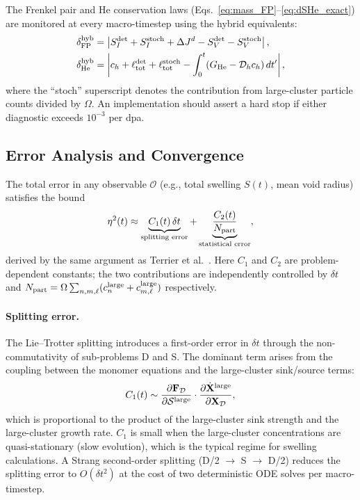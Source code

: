 \documentclass[pdflatex,sn-basic]{sn-jnl} %
\begin{document}
The Frenkel pair and He conservation laws
(Eqs.~\ref{eq:mass_FP}--\ref{eq:dSHe_exact}) are monitored at
every macro-timestep using the hybrid equivalents:
\begin{align}
    \delta_{\rm FP}^{\rm hyb}
    &= \left|
         S_I^{\rm det} + S_I^{\rm stoch}
         + \Delta J^d
         - S_V^{\rm det} - S_V^{\rm stoch}
       \right|,
    \label{eq:hybrid_dFP}\\
    \delta_{\rm He}^{\rm hyb}
    &= \left|
         c_h + \ell_{\rm tot}^{\rm det} + \ell_{\rm tot}^{\rm stoch}
         - \int_0^t (G_{\rm He} - \mathcal{D}_h c_h)\,dt'
       \right|,
    \label{eq:hybrid_dHe}
\end{align}
where the ``stoch'' superscript denotes the contribution from
large-cluster particle counts divided by $\Omega$.  An
implementation should assert a hard stop if either diagnostic
exceeds $10^{-3}$ per dpa.

\subsection{Error Analysis and Convergence}
\label{sec:hybrid_error}

The total error in any observable $\mathcal{O}$ (e.g., total
swelling $S(t)$, mean void radius) satisfies the bound
\begin{equation}\label{eq:hybrid_error}
    \eta^2(t)
    \approx \underbrace{C_1(t)\,\delta t}_{\text{splitting error}}
    + \underbrace{\frac{C_2(t)}{N_{\rm part}}}_{\text{statistical error}},
\end{equation}
derived by the same argument as Terrier et al.~\cite{Terrier2017}.
Here $C_1$ and $C_2$ are problem-dependent constants; the two
contributions are independently controlled by $\delta t$ and
$N_{\rm part} = \Omega \sum_{n,m,\ell}(c_n^{\rm large} +
c_{m,\ell}^{\rm large})$ respectively.

\paragraph{Splitting error.}
The Lie--Trotter splitting introduces a first-order error in
$\delta t$ through the non-commutativity of sub-problems D and S.
The dominant term arises from the coupling between the monomer
equations and the large-cluster sink/source terms:
\begin{equation}\label{eq:splitting_error_estimate}
    C_1(t) \sim
    \frac{\partial \mathbf{F}_{\mathcal{D}}}{\partial \mathcal{S}^{\rm large}}
    \cdot
    \frac{\partial \dot{\mathbf{X}}^{\rm large}}{\partial \mathbf{X}_{\mathcal{D}}},
\end{equation}
which is proportional to the product of the large-cluster sink
strength and the large-cluster growth rate.  $C_1$ is small when
the large-cluster concentrations are quasi-stationary (slow
evolution), which is the typical regime for swelling calculations.
A Strang second-order splitting (D/2 $\to$ S $\to$ D/2) reduces
the splitting error to $O(\delta t^2)$ at the cost of two
deterministic ODE solves per macro-timestep.
\end{document}
